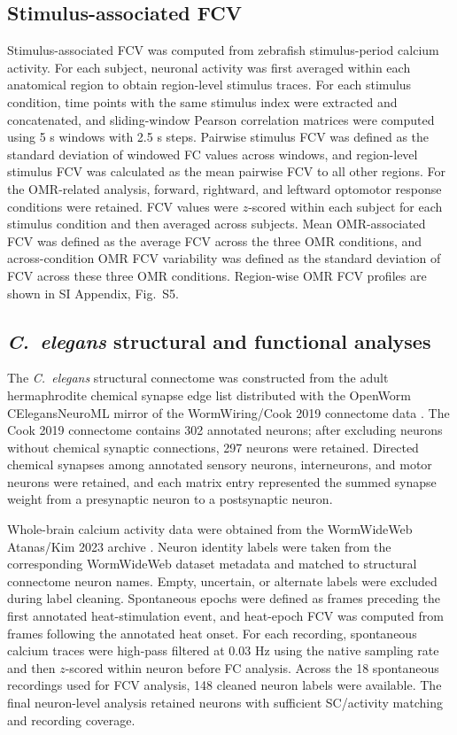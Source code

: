 \documentclass[9pt,twocolumn,twoside]{pnas-new}
\begin{document}
{\subsection*{Stimulus-associated FCV}

Stimulus-associated FCV was computed from zebrafish stimulus-period calcium activity. For each subject, neuronal activity was first averaged within each anatomical region to obtain region-level stimulus traces. For each stimulus condition, time points with the same stimulus index were extracted and concatenated, and sliding-window Pearson correlation matrices were computed using 5 s windows with 2.5 s steps. Pairwise stimulus FCV was defined as the standard deviation of windowed FC values across windows, and region-level stimulus FCV was calculated as the mean pairwise FCV to all other regions. For the OMR-related analysis, forward, rightward, and leftward optomotor response conditions were retained. FCV values were $z$-scored within each subject for each stimulus condition and then averaged across subjects. Mean OMR-associated FCV was defined as the average FCV across the three OMR conditions, and across-condition OMR FCV variability was defined as the standard deviation of FCV across these three OMR conditions. Region-wise OMR FCV profiles are shown in SI Appendix, Fig.~S5.

\subsection*{\textit{C.~elegans} structural and functional analyses}

The \textit{C.~elegans} structural connectome was constructed from the adult hermaphrodite chemical synapse edge list distributed with the OpenWorm CElegansNeuroML mirror of the WormWiring/Cook 2019 connectome data \citep{Cook2019}. The Cook 2019 connectome contains 302 annotated neurons; after excluding neurons without chemical synaptic connections, 297 neurons were retained. Directed chemical synapses among annotated sensory neurons, interneurons, and motor neurons were retained, and each matrix entry represented the summed synapse weight from a presynaptic neuron to a postsynaptic neuron.

Whole-brain calcium activity data were obtained from the WormWideWeb Atanas/Kim 2023 archive \citep{AtanasKim2023}. Neuron identity labels were taken from the corresponding WormWideWeb dataset metadata and matched to structural connectome neuron names. Empty, uncertain, or alternate labels were excluded during label cleaning. Spontaneous epochs were defined as frames preceding the first annotated heat-stimulation event, and heat-epoch FCV was computed from frames following the annotated heat onset. For each recording, spontaneous calcium traces were high-pass filtered at 0.03 Hz using the native sampling rate and then $z$-scored within neuron before FC analysis. Across the 18 spontaneous recordings used for FCV analysis, 148 cleaned neuron labels were available. The final neuron-level analysis retained neurons with sufficient SC/activity matching and recording coverage.

}
\end{document}
